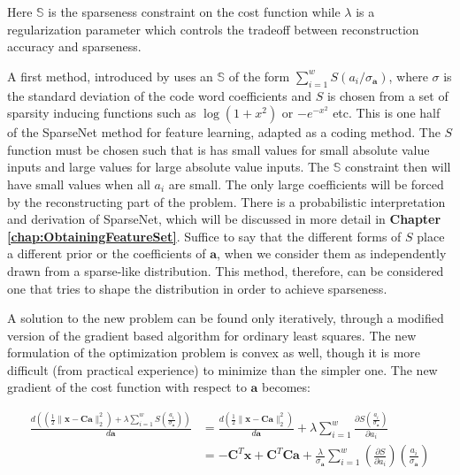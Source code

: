 \documentclass[12pt,a4paper,oneside,english]{UPBThesis}
\begin{document}
Here $\mathbb{S}$ is the sparseness constraint on the cost function while $\lambda$ is a regularization parameter which controls the tradeoff between reconstruction accuracy and sparseness.

A first method, introduced by \cite{emergence-sparse-coding} uses an $\mathbb{S}$ of the form $\sum_{i=1}^w{S(a_i / \sigma_{\textbf{a}})}$, where $\sigma$ is the standard deviation of the code word coefficients and $S$ is chosen from a set of sparsity inducing functions such as $\log(1 + x^2)$ or $-e^{-x^2}$ etc. This is one half of the SparseNet method for feature learning, adapted as a coding method. The $S$ function must be chosen such that is has small values for small absolute value inputs and large values for large absolute value inputs. The $\mathbb{S}$ constraint then will have small values when all $a_i$ are small. The only large coefficients will be forced by the reconstructing part of the problem. There is a probabilistic interpretation and derivation of SparseNet, which will be discussed in more detail in \textbf{Chapter \ref{chap:ObtainingFeatureSet}}. Suffice to say that the different forms of $S$ place a different prior or the coefficients of $\textbf{a}$, when we consider them as independently drawn from a sparse-like distribution. This method, therefore, can be considered one that tries to shape the distribution in order to achieve sparseness.

A solution to the new problem can be found only iteratively, through a modified version of the gradient based algorithm for ordinary least squares. The new formulation of the optimization problem is convex as well, though it is more difficult (from practical experience) to minimize than the simpler one. The new gradient of the cost function with respect to $\textbf{a}$ becomes:

\begin{align*}
\frac{d \left( \left( \frac{1}{2}\|\textbf{x} - \textbf{C}\textbf{a}\|_2^2 \right) + \lambda\sum_{i=1}^{w}{S(\frac{a_i}{\sigma_{\textbf{a}}})} \right)}{d\textbf{a}} & = \frac{d \left( \frac{1}{2}\|\textbf{x} - \textbf{C}\textbf{a}\|_2^2 \right)}{d\textbf{a}} + \lambda\sum_{i=1}^{w}\frac{\partial S(\frac{a_i}{\sigma_{\textbf{a}}})}{\partial a_i} \\
& = -\textbf{C}^T\textbf{x} + \textbf{C}^T\textbf{C}\textbf{a} + \frac{\lambda}{\sigma_{\textbf{a}}} \sum_{i=1}^{w} {\left( \frac{\partial S}{\partial a_i} \right) \left( \frac{a_i}{\sigma_{\textbf{a}}} \right)}
\end{align*}
\end{document}
